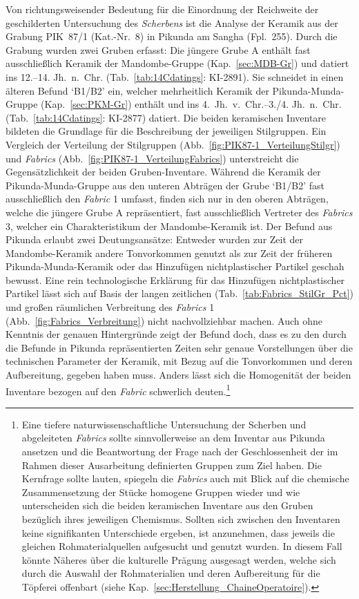 Von richtungsweisender Bedeutung für die Einordnung der Reichweite der geschilderten Untersuchung des \textit{Scherbens} ist die Analyse der Keramik aus der Grabung PIK~87/1 (Kat.-Nr.~8) in Pikunda am Sangha (Fpl.~255). Durch die Grabung wurden zwei Gruben erfasst: Die jüngere Grube A enthält fast ausschließlich Keramik der Mandombe-Gruppe (Kap.~\ref{sec:MDB-Gr}) und datiert ins 12.--14. Jh.~n.~Chr. (Tab.~\ref{tab:14Cdatings}: KI-2891). Sie schneidet in einen älteren Befund \enquote*{B1/B2} ein, welcher mehrheitlich Keramik der Pikunda-Munda-Gruppe (Kap.~\ref{sec:PKM-Gr}) enthält und ins 4.~Jh.~v.~Chr.--3./4. Jh.~n.~Chr. (Tab.~\ref{tab:14Cdatings}: KI-2877) datiert. Die beiden keramischen Inventare bildeten die Grundlage für die Beschreibung der jeweiligen Stilgruppen. Ein Vergleich der Verteilung der Stilgruppen (Abb.~\ref{fig:PIK87-1_VerteilungStilgr}) und \textit{Fabrics} (Abb.~\ref{fig:PIK87-1_VerteilungFabrics}) unterstreicht die Gegensätzlichkeit der beiden Gruben-Inventare. Während die Keramik der Pikunda-Munda-Gruppe aus den unteren Abträgen der Grube \enquote*{B1/B2} fast ausschließlich den \textit{Fabric} 1 umfasst, finden sich nur in den oberen Abträgen, welche die jüngere Grube A repräsentiert, fast ausschließlich Vertreter des \textit{Fabrics} 3, welcher ein Charakteristikum der Mandombe-Keramik ist. Der Befund aus Pikunda erlaubt zwei Deutungsansätze: Entweder wurden zur Zeit der Mandombe-Keramik andere Tonvorkommen genutzt als zur Zeit der früheren Pikunda-Munda-Keramik oder das Hinzufügen nichtplastischer Partikel geschah bewusst. Eine rein technologische Erklärung für das Hinzufügen nichtplastischer Partikel lässt sich auf Basis der langen zeitlichen (Tab.~\ref{tab:Fabrics_StilGr_Pct}) und großen räumlichen Verbreitung des \textit{Fabrics} 1 (Abb.~\ref{fig:Fabrics_Verbreitung}) nicht nachvollziehbar machen. Auch ohne Kenntnis der genauen Hintergründe zeigt der Befund doch, dass es zu den durch die Befunde in Pikunda repräsentierten Zeiten sehr genaue Vorstellungen über die technischen Parameter der Keramik, mit Bezug auf die Tonvorkommen und deren Aufbereitung, gegeben haben muss. Anders lässt sich die Homogenität der beiden Inventare bezogen auf den \textit{Fabric} schwerlich deuten.\footnote{Eine tiefere naturwissenschaftliche Untersuchung der Scherben und abgeleiteten \textit{Fabrics} sollte sinnvollerweise an dem Inventar aus Pikunda ansetzen und die Beantwortung der Frage nach der Geschlossenheit der im Rahmen dieser Ausarbeitung definierten Gruppen zum Ziel haben. Die Kernfrage sollte lauten, spiegeln die \textit{Fabrics} auch mit Blick auf die chemische Zusammensetzung der Stücke homogene Gruppen wieder und wie unterscheiden sich die beiden keramischen Inventare aus den Gruben bezüglich ihres jeweiligen Chemismus. Sollten sich zwischen den Inventaren keine signifikanten Unterschiede ergeben, ist anzunehmen, dass jeweils die gleichen Rohmaterialquellen aufgesucht und genutzt wurden. In diesem Fall könnte Näheres über die kulturelle Prägung ausgesagt werden, welche sich durch die Auswahl der Rohmaterialien und deren Aufbereitung für die Töpferei offenbart (siehe Kap.~\ref{sec:Herstellung_ChaineOperatoire}).}


